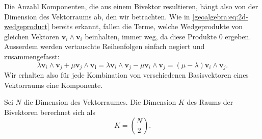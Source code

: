 Die Anzahl Komponenten, die aus einem Bivektor resultieren, hängt also von der Dimension des Vektorraums ab, den wir betrachten.
Wie in \eqref{geoalgebra:eq:2d-wedgeproduct} bereits erkannt, fallen die Terme, welche Wedgeprodukte von gleichen Vektoren $\mathbf{v}_i \wedge \mathbf{v}_i$ beinhalten,
immer weg, da diese Produkte $0$ ergeben. Ausserdem werden vertauschte Reihenfolgen einfach negiert und zusammengefasst: 
\begin{equation}
  \lambda \mathbf{v}_i \wedge \mathbf{v}_j + \mu \mathbf{v}_j \wedge \mathbf{v_i} = \lambda \mathbf{v}_i \wedge \mathbf{v}_j - \mu \mathbf{v}_i \wedge \mathbf{v}_j = (\mu - \lambda) \mathbf{v}_i \wedge \mathbf{v}_j.
\end{equation}
Wir erhalten also für jede Kombination von verschiedenen Basisvektoren eines Vektorraums eine Komponente.
\begin{satz}
Sei $N$ die Dimension des Vektorraumes. Die Dimension $K$ des Raums der Bivektoren berechnet sich als
  \begin{equation}
    \label{geoalgebra:eq:components-bivectors}
    K = \binom{N}{2}.
  \end{equation}
\end{satz}


